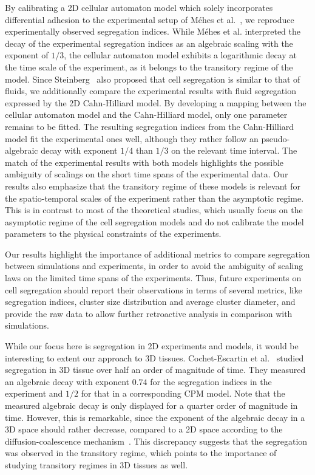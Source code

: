 \documentclass[10pt,letterpaper]{article}
\begin{document}
By calibrating a 2D cellular automaton model which solely
incorporates differential adhesion to the experimental setup of Méhes
et al.~\cite{MehMonNemVic2012}, we reproduce experimentally observed
segregation indices. While Méhes et al. interpreted the decay of the
experimental segregation indices as an algebraic scaling with the
exponent of $1/3$, the cellular automaton model exhibits a logarithmic
decay at the time scale of the experiment, as it belongs to the
transitory regime of the model. Since Steinberg~\cite{Ste1970} also
proposed that cell segregation is similar to that of fluids, we
additionally compare the experimental results with fluid segregation
expressed by the 2D Cahn-Hilliard model. By developing a mapping
between the cellular automaton model and the Cahn-Hilliard model, only
one parameter remains to be fitted. The resulting segregation indices
from the Cahn-Hilliard model fit the experimental ones well, although
they rather follow an pseudo-algebraic decay with exponent $1/4$ than $1/3$
on the relevant time interval. The match of the experimental results
with both models highlights the possible ambiguity of scalings on
the short time spans
of the experimental data. Our results also emphasize that the transitory
regime of these models is relevant for the spatio-temporal scales of the
experiment rather than the asymptotic regime. This is in contrast to most
of the theoretical studies, which usually focus on the asymptotic regime
of the cell segregation models and do not calibrate the model parameters
to the physical constraints of the experiments.

Our results highlight the importance of additional metrics to compare
segregation between simulations and experiments, in order to avoid the
ambiguity of scaling laws on the limited time spans of the experiments.
Thus, future experiments on cell segregation should report their
observations in terms of several metrics, like segregation indices,
cluster size distribution and average cluster diameter, and provide
the raw data to allow further retroactive analysis in comparison
with simulations.

While our focus here is segregation in 2D experiments and models, it
would be interesting to extent our approach to 3D tissues.
Cochet-Escartin et al.~\cite{CocLocSteCol2017} studied segregation in
3D tissue over half an order of magnitude of time. They measured an
algebraic decay with exponent $0.74$ for the segregation indices in
the experiment and $1/2$ for that in a corresponding CPM model. Note that the
measured algebraic decay is only displayed for a quarter order of
magnitude in time. However, this is remarkable, since the exponent of
the algebraic decay in a 3D space should rather decrease, compared to
a 2D space according to the diffusion-coalescence
mechanism~\cite{BeaAlmBru2017, Mea1990, Kol1984}. This discrepancy
suggests that the segregation was observed in the transitory regime,
which points to the importance of studying transitory regimes in 3D
tissues as well.
\end{document}
